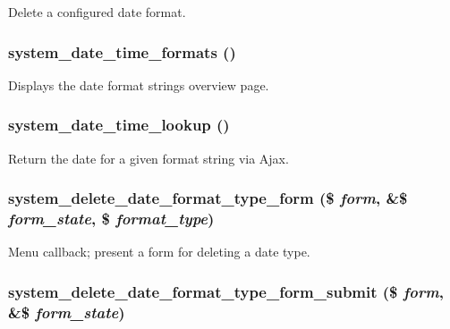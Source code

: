 \label{system_8admin_8inc_a8eb5f9af75f1ac4f9b96a305f032c29e}
Delete a configured date format. \hypertarget{system_8admin_8inc_aa6407c07ce1ab0298615d4e31e61cc5f}{
\subsubsection[{system\_\-date\_\-time\_\-formats}]{\setlength{\rightskip}{0pt plus 5cm}system\_\-date\_\-time\_\-formats ()}}
\label{system_8admin_8inc_aa6407c07ce1ab0298615d4e31e61cc5f}
Displays the date format strings overview page. \hypertarget{system_8admin_8inc_a586fa7e48055bce7f644065259a29a6c}{
\subsubsection[{system\_\-date\_\-time\_\-lookup}]{\setlength{\rightskip}{0pt plus 5cm}system\_\-date\_\-time\_\-lookup ()}}
\label{system_8admin_8inc_a586fa7e48055bce7f644065259a29a6c}
Return the date for a given format string via Ajax. \hypertarget{system_8admin_8inc_af3ae6c701b15a83518c2aa5ada9a5f5d}{
\subsubsection[{system\_\-delete\_\-date\_\-format\_\-type\_\-form}]{\setlength{\rightskip}{0pt plus 5cm}system\_\-delete\_\-date\_\-format\_\-type\_\-form (\$ {\em form}, \/  \&\$ {\em form\_\-state}, \/  \$ {\em format\_\-type})}}
\label{system_8admin_8inc_af3ae6c701b15a83518c2aa5ada9a5f5d}
Menu callback; present a form for deleting a date type. \hypertarget{system_8admin_8inc_af8f1dc0f2dda0917fc8b8e03d81f3979}{
\subsubsection[{system\_\-delete\_\-date\_\-format\_\-type\_\-form\_\-submit}]{\setlength{\rightskip}{0pt plus 5cm}system\_\-delete\_\-date\_\-format\_\-type\_\-form\_\-submit (\$ {\em form}, \/  \&\$ {\em form\_\-state})}}
